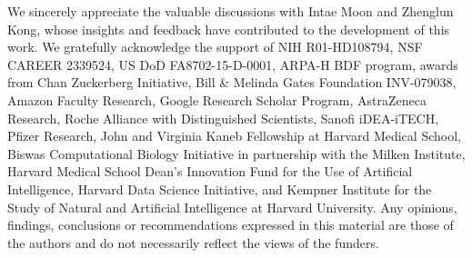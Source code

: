 We sincerely appreciate the valuable discussions with Intae Moon and Zhenglun Kong, whose insights and feedback have contributed to the development of this work. We gratefully acknowledge the support of NIH R01-HD108794, NSF CAREER 2339524, US DoD FA8702-15-D-0001, ARPA-H BDF program, awards from Chan Zuckerberg Initiative, Bill \& Melinda Gates Foundation INV-079038, Amazon Faculty Research, Google Research Scholar Program, AstraZeneca Research, Roche Alliance with Distinguished Scientists, Sanofi iDEA-iTECH, Pfizer Research, John and Virginia Kaneb Fellowship at Harvard Medical School, Biswas Computational Biology Initiative in partnership with the Milken Institute, Harvard Medical School Dean's Innovation Fund for the Use of Artificial Intelligence, Harvard Data Science Initiative, and Kempner Institute for the Study of Natural and Artificial Intelligence at Harvard University. Any opinions, findings, conclusions or recommendations expressed in this material are those of the authors and do not necessarily reflect the views of the funders.